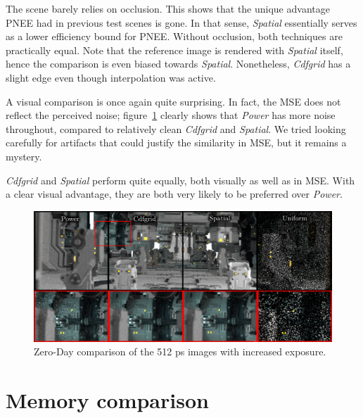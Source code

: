 The scene barely relies on occlusion. This shows that the unique advantage PNEE had in previous test scenes is gone. In that sense, \textit{Spatial} essentially serves as a lower efficiency bound for PNEE. Without occlusion, both techniques are practically equal. Note that the reference image is rendered with \textit{Spatial} itself, hence the comparison is even biased towards \textit{Spatial}. Nonetheless, \textit{Cdfgrid} has a slight edge even though interpolation was active. 

A visual comparison is once again quite surprising. In fact, the MSE does not reflect the perceived noise; figure~\ref{fig:zdcomp} clearly shows that \textit{Power} has more noise throughout, compared to relatively clean \textit{Cdfgrid} and \textit{Spatial}. We tried looking carefully for artifacts that could justify the similarity in MSE, but it remains a mystery.

\textit{Cdfgrid} and \textit{Spatial} perform quite equally, both visually as well as in MSE. With a clear visual advantage, they are both very likely to be preferred over \textit{Power}.

\begin{figure}
    \centering
    \includegraphics[width=1\textwidth]{figures/comparisons/ZDcomp_slim.pdf}
    \caption{Zero-Day comparison of the 512 ps images with increased exposure. }
    \label{fig:zdcomp}
\end{figure}


\FloatBarrier
\section{Memory comparison}

